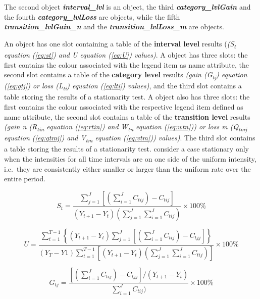 The second object \emph{\textbf{interval\_lvl}} is an 
object, the third \emph{\textbf{category\_lvlGain}} and the fourth
\emph{\textbf{category\_lvlLoss}} are  objects, while
the fifth \emph{\textbf{transition\_lvlGain\_n}} and the
\emph{\textbf{transition\_lvlLoss\_m}} are  objects.

An  object has one slot containing a table of the
\textbf{interval level} results (\emph{(S\textsubscript{t} equation
(\ref{eq:st}) and U equation (\ref{eq:U}) values)}. A 
object has three slots: the first contains the colour associated with
the legend item as name attribute, the second slot contains a table of
the \textbf{category level} results \emph{(gain (G\textsubscript{tj})
equation (\ref{eq:gtj}) or loss (L\textsubscript{ti}) equation
(\ref{eq:lti}) values)}, and the third slot contains a table storing the
results of a stationarity test. A  object also has
three slots: the first contains the colour associated with the
respective legend item defined as name attribute, the second slot
contains a table of the \textbf{transition level} results \emph{(gain n
(R\textsubscript{tin} equation (\ref{eq:rtin}) and W\textsubscript{tn}
equation (\ref{eq:wtn})) or loss m (Q\textsubscript{tmj} equation
(\ref{eq:qtmj}) and V\textsubscript{tm} equation (\ref{eq:vtm}))
values)}. The third slot contains a table storing the results of a
stationarity test. \citet{Aldwaik2012} consider a case stationary only
when the intensities for all time intervals are on one side of the
uniform intensity, i.e.~they are consistently either smaller or larger
than the uniform rate over the entire period.

\begin{equation} \label{eq:st}
S_t = \frac{\sum_{j=1}^{J} \left[( \sum_{i=1}^{J} C_{tij}) - C_{tij} \right]}{(Y_{t+1} - Y_{t})\left(\sum_{j=1}^{J} \sum_{i=1}^{J} C_{tij}\right)} \times 100\%
\end{equation}

\begin{equation} \label{eq:U}
U = \frac{\sum_{t=1}^{T-1} \left\{(Y_{t+1} - Y_t) \sum_{j=1}^{J} \left[\left(\sum_{i=1}^{J} C_{tij}\right) - C_{tjj}   \right]\right\}}{(Y_{T} - Y1) \sum_{t=1}^{T-1} \left[(Y_{t+1} - Y_t) \left(\sum_{j=1}^{J} \sum_{i=1}^{J} C_{tij}\right)  \right]} \times 100\%
\end{equation}

\begin{equation} \label{eq:gtj}
G_{tj} = \frac{\left[\left( \sum_{i=1}^{J} C_{tij} \right) - C_{tjj}   \right] / (Y_{t+1} - Y_t)}{\sum_{i=1}^{J} C_{tij})} \times 100\%
\end{equation}

